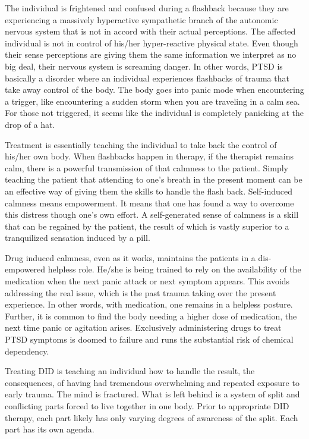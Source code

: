 \documentclass[]{book}
\begin{document}
The individual is frightened and confused during a flashback because they are experiencing a massively hyperactive sympathetic branch of the autonomic nervous system that is not in accord with their actual perceptions. The affected individual is not in control of his/her hyper-reactive physical state. Even though their sense perceptions are giving them the same information we interpret as no big deal, their nervous system is screaming danger. In other words, PTSD is basically a disorder where an individual experiences flashbacks of trauma that take away control of the body. The body goes into panic mode when encountering a trigger, like encountering a sudden storm when you are traveling in a calm sea. For those not triggered, it seems like the individual is completely panicking at the drop of a hat.

Treatment is essentially teaching the individual to take back the control of his/her own body. When flashbacks happen in therapy, if the therapist remains calm, there is a powerful transmission of that calmness to the patient. Simply teaching the patient that attending to one's breath in the present moment can be an effective way of giving them the skills to handle the flash back. Self-induced calmness means empowerment. It means that one has found a way to overcome this distress though one's own effort. A self-generated sense of calmness is a skill that can be regained by the patient, the result of which is vastly superior to a tranquilized sensation induced by a pill.

Drug induced calmness, even as it works, maintains the patients in a dis-empowered helpless role. He/she is being trained to rely on the availability of the medication when the next panic attack or next symptom appears. This avoids addressing the real issue, which is the past trauma taking over the present experience. In other words, with medication, one remains in a helpless posture. Further, it is common to find the body needing a higher dose of medication, the next time panic or agitation arises. Exclusively administering drugs to treat PTSD symptoms is doomed to failure and runs the substantial risk of chemical dependency.

Treating DID is teaching an individual how to handle the result, the consequences, of having had tremendous overwhelming and repeated exposure to early trauma. The mind is fractured. What is left behind is a system of split and conflicting parts forced to live together in one body. Prior to appropriate DID therapy, each part likely has only varying degrees of awareness of the split. Each part has its own agenda.
\end{document}
